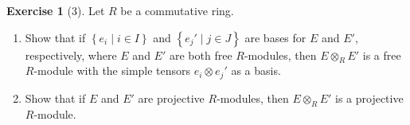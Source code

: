 \documentclass[reqno]{amsart}
\theoremstyle{definition}
\newtheorem{exercise}[theorem]{Exercise}
\theoremstyle{remark}
\begin{document}
    \begin{exercise}[3]
        Let $R$ be a commutative ring.
        \begin{enumerate}
            \item Show that if
                $\left\{ e_i  \mid i \in I \right\} $ and
                $\left\{ e_{j}'  \mid j \in J \right\} $ 
                are bases for
                $E$ and $E'$, respectively, where
                $E$ and $E'$ are both free $R$-modules,
                then $E \otimes_{R} E'$ is a free
                $R$-module with
                the simple tensors $e_i \otimes e_{j}'$  as a
                basis.
            \item Show that if $E$ and $E'$ are 
                projective $R$-modules, then
                $E \otimes_R E'$ is a projective $R$-module.
        \end{enumerate}
    \end{exercise}
\end{document}
